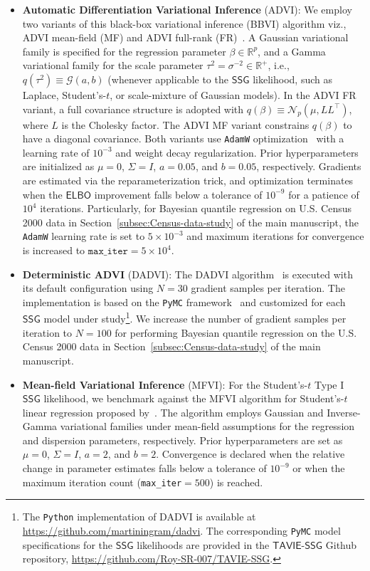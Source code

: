 \documentclass[12pt]{article}
\numberwithin{equation}{section}
\newcommand{\tssg}{\mathsf{TAVIE}\text{-}\mathsf{SSG}}
\begin{document}
\begin{itemize}
    \item \textbf{Automatic Differentiation Variational Inference} (ADVI): We employ two variants of this black-box variational inference (BBVI) algorithm viz., ADVI mean-field (MF) and ADVI full-rank (FR)~\citep{advi}. A Gaussian variational family is specified for the regression parameter $\beta \in \mathbb{R}^{p}$, and a Gamma variational family for the scale parameter $\tau^{2} = \sigma^{-2} \in \mathbb{R}^{+}$, i.e., $q(\tau^2) \equiv \mathcal{G}(a, b)$ (whenever applicable to the $\mathsf{SSG}$ likelihood, such as Laplace, Student's-$t$, or scale-mixture of Gaussian models). In the ADVI FR variant, a full covariance structure is adopted with $q(\beta) \equiv \mathcal{N}_{p}(\mu, LL^{\top})$, where $L$ is the Cholesky factor. The ADVI MF variant constrains $q(\beta)$ to have a diagonal covariance. Both variants use \texttt{AdamW} optimization~\citep{AdamW} with a learning rate of $10^{-3}$ and weight decay regularization. Prior hyperparameters are initialized as $\mu = 0$, $\Sigma = I$, $a=0.05$, and $b = 0.05$, respectively. Gradients are estimated via the reparameterization trick, and optimization terminates when the $\mathsf{ELBO}$ improvement falls below a tolerance of $10^{-9}$ for a patience of $10^{4}$ iterations. Particularly, for Bayesian quantile regression on U.S. Census 2000 data in Section~\ref{subsec:Census-data-study} of the main manuscript, the \texttt{AdamW} learning rate is set to $5\times 10^{-3}$ and maximum iterations for convergence is increased to $\texttt{max\_iter} = 5\times 10^4$.

    \item \textbf{Deterministic ADVI} (DADVI): The DADVI algorithm~\citep{dadvi} is executed with its default configuration using $N=30$ gradient samples per iteration. The implementation is based on the \texttt{PyMC} framework~\citep{pymc,pymc2023peerj} and customized for each $\mathsf{SSG}$ model under study\footnote{The \texttt{Python} implementation of DADVI is available at \url{https://github.com/martiningram/dadvi}. The corresponding \texttt{PyMC} model specifications for the $\mathsf{SSG}$ likelihoods are provided in the $\tssg$ Github repository, \url{https://github.com/Roy-SR-007/TAVIE-SSG}.}. We increase the number of gradient samples per iteration to $N=100$ for performing Bayesian quantile regression on the U.S. Census 2000 data in Section~\ref{subsec:Census-data-study} of the main manuscript.

    \item \textbf{Mean-field Variational Inference} (MFVI): For the Student's-$t$ Type I $\mathsf{SSG}$ likelihood, we benchmark against the MFVI algorithm for Student's-$t$ linear regression proposed by~\cite{mfvi-student}. The algorithm employs Gaussian and Inverse-Gamma variational families under mean-field assumptions for the regression and dispersion parameters, respectively. Prior hyperparameters are set as $\mu = 0$, $\Sigma = I$, $a=2$, and $b=2$. Convergence is declared when the relative change in parameter estimates falls below a tolerance of $10^{-9}$ or when the maximum iteration count (\texttt{max\_iter}$=500$) is reached.



\end{itemize}
\end{document}
